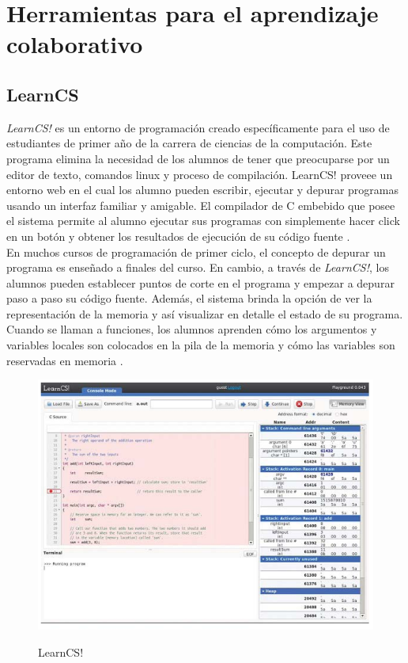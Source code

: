 \newpage
\section{Herramientas para el aprendizaje colaborativo}

\subsection{LearnCS}
\emph{LearnCS!} es un entorno de programación creado específicamente para el uso de estudiantes de primer año de la carrera de ciencias de la computación. Este programa elimina la necesidad de los alumnos de tener que preocuparse por un editor de texto, comandos linux y proceso de compilación. LearnCS! proveee un entorno web en el cual los alumno pueden escribir, ejecutar y depurar programas usando un interfaz familiar y amigable. El compilador de C embebido que posee el sistema permite al alumno ejecutar sus programas con simplemente hacer click en un botón y obtener los resultados de ejecución de su código fuente \cite{lipman_learncs_2014}.\\

En muchos cursos de programación de primer ciclo, el concepto de depurar un programa es enseñado a finales del curso. En cambio, a través de \emph{LearnCS!}, los alumnos pueden establecer puntos de corte en el programa y empezar a depurar paso a paso su código fuente. Además, el sistema brinda la opción de ver la representación de la memoria y así visualizar en detalle el estado de su programa. Cuando se llaman a funciones, los alumnos aprenden cómo los argumentos y variables locales son colocados en la pila de la memoria y cómo las variables son reservadas en memoria \cite{lipman_learncs_2014}.\\

\begin{figure}[!h]
  \centering
  \includegraphics[scale=0.4]{figuras/learncs.png}\\
  \caption[LearnCS]{LearnCS! \protect\cite{lipman_learncs_2014}}
  \label{fig:learncs}
\end{figure}

